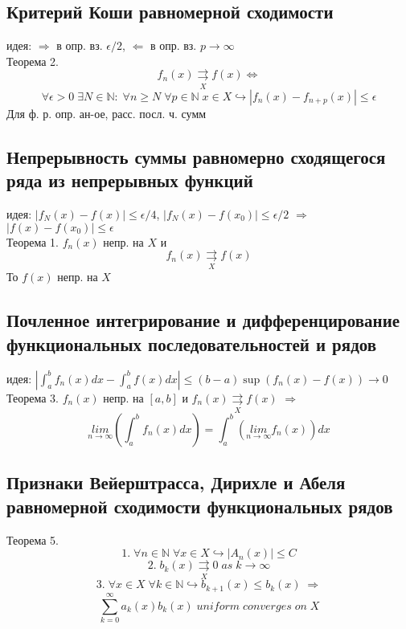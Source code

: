 \documentclass{article}
\begin{document}
\subsection{Критерий Коши равномерной сходимости}
идея: $\Rightarrow$ в опр. вз. $\epsilon/2$, $\Leftarrow$ в опр. вз. $p \rightarrow \infty$ \\
Теорема 2.
\begin{equation*}
    f_n (x) \underset{X}{\rightrightarrows} f(x) \Leftrightarrow
\end{equation*}
\begin{equation*}
    \forall \epsilon>0 \; \exists N \in \mathbb N: \; \forall n \geq N \; \forall p \in \mathbb N \; x \in X \hookrightarrow |f_n (x)-f_{n+p}(x)| \leq \epsilon
\end{equation*}
Для ф. р. опр. ан-ое, расс. посл. ч. сумм
\subsection{Непрерывность суммы равномерно сходящегося ряда из непрерывных функций}
идея: $|f_N(x) - f(x)| \leq \epsilon/4$, $|f_N(x)-f(x_0)| \leq \epsilon/2$ $\Rightarrow$ $|f(x)-f(x_0)| \leq \epsilon$ \\
Теорема 1. $f_n(x)$ непр. на $X$ и
\begin{equation*}
    f_n (x) \underset{X}{\rightrightarrows} f(x)
\end{equation*}
То $f(x)$ непр. на $X$
\subsection{Почленное интегрирование и дифференцирование функциональных последовательностей и рядов}
идея: $|\int_a^b f_n(x) dx - \int_a^b f(x) dx| \leq (b-a) \sup (f_n(x)-f(x)) \rightarrow 0$ \\
Теорема 3. $f_n(x)$ непр. на $[a,b]$ и $f_n (x) \underset{X}{\rightrightarrows} f(x)$ $\Rightarrow$
\begin{equation*}
    \underset{n \rightarrow \infty}{lim} (\int_a^b f_n(x) dx) = \int_a^b (\underset{n \rightarrow \infty}{lim} f_n (x)) dx
\end{equation*}
\subsection{Признаки Вейерштрасса, Дирихле и Абеля равномерной сходимости функциональных рядов}
Теорема 5.
\begin{equation*}
    1. \; \forall n \in \mathbb N \; \forall x \in X \hookrightarrow |A_n(x)| \leq C
\end{equation*}
\begin{equation*}
    2. \; b_k (x) \underset{X}{\rightrightarrows} 0 \; as\; k \rightarrow \infty
\end{equation*}
\begin{equation*}
    3. \; \forall x \in X \; \forall k \in \mathbb N \hookrightarrow b_{k+1}(x) \leq b_k(x) \; \Rightarrow
\end{equation*}
\begin{equation*}
    \sum_{k=0}^\infty a_k(x)b_k(x) \; uniform \; converges \; on \; X
\end{equation*}
\end{document}
